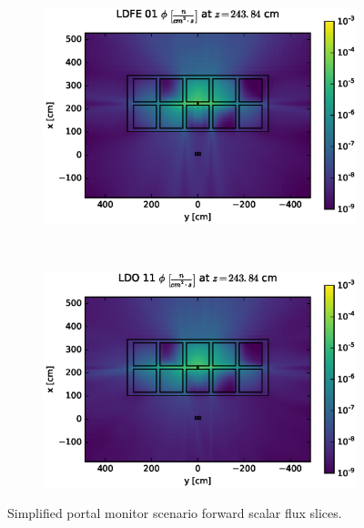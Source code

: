 \begin{figure}[!htb]
\ContinuedFloat
\begin{subfigure}{\textwidth}
\centering
\includegraphics[max height=0.445\textheight]
{img/cargo-plots/fwd/flux-ldfe01-slice.eps}
\end{subfigure}
\\
\begin{subfigure}{\textwidth}
\centering
\includegraphics[max height=0.445\textheight]
{img/cargo-plots/fwd/flux-ldo11-slice.eps}
\end{subfigure}
\caption{Simplified portal monitor scenario forward scalar flux slices.}
\label{cargo-fwd-slices}
\end{figure}

